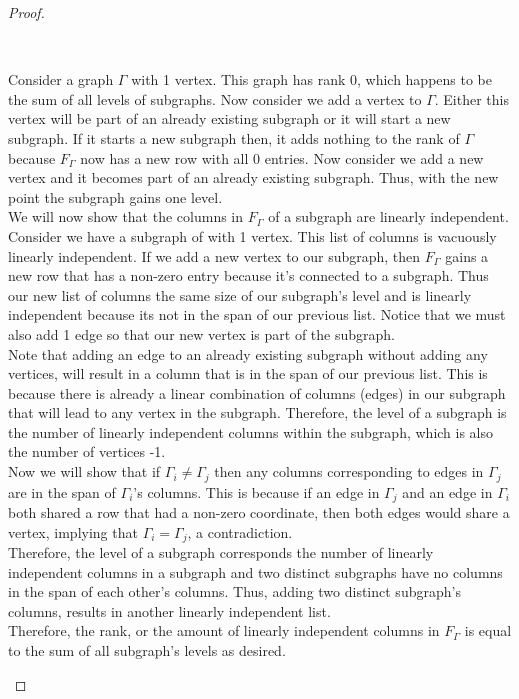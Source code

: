\documentclass[11pt]{article}
\newenvironment{myproof}
{\begin{proof} \begin{adjustwidth}{3em}{0pt}$ $\par\nobreak\ignorespaces}
{\end{adjustwidth} \end{proof}}
\begin{document}
\begin{flushleft}
\begin{myproof}
Consider a graph $\Gamma$ with 1 vertex. This graph has rank 0, which happens to be the sum of all levels of subgraphs. Now consider we add a vertex to $\Gamma$. Either this vertex will be part of an already existing subgraph or it will start a new subgraph. If it starts a new subgraph then, it adds nothing to the rank of $\Gamma$ because $F_\Gamma$ now has a new row with all 0 entries. Now consider we add a new vertex and it becomes part of an already existing subgraph. Thus, with the new point the subgraph gains one level. \\
\bigskip
We will now show that the columns in $F_\Gamma$ of a subgraph are linearly independent. Consider we have a subgraph of with 1 vertex. This list of columns is vacuously linearly independent. If we add a new vertex to our subgraph, then $F_\Gamma$ gains a new row that has a non-zero entry because it's connected to a subgraph. Thus our new list of columns the same size of our subgraph's level and is linearly independent because its not in the span of our previous list. Notice that we must also add 1 edge so that our new vertex is part of the subgraph. \\
\bigskip
Note that adding an edge to an already existing subgraph without adding any vertices, will result in a column that is in the span of our previous list. This is because there is already a linear combination of columns (edges) in our subgraph that will lead to any vertex in the subgraph. Therefore, the level of a subgraph is the number of linearly independent columns within the subgraph, which is also the number of vertices -1. \\
\bigskip
Now we will show that if $\Gamma_i \neq \Gamma_j$ then any columns corresponding to edges in $\Gamma_j$ are in the span of $\Gamma_i$'s columns. This is because if an edge in $\Gamma_j$ and an edge in $\Gamma_i$ both shared a row that had a non-zero coordinate, then both edges would share a vertex, implying that $\Gamma_i = \Gamma_j$, a contradiction. \\
\bigskip
Therefore, the level of a subgraph corresponds the number of linearly independent columns in a subgraph and two distinct subgraphs have no columns in the span of each other's columns. Thus, adding two distinct subgraph's columns, results in another linearly independent list. \\
\bigskip
Therefore, the rank, or the amount of linearly independent columns in $F_\Gamma$ is equal to the sum of all subgraph's levels as desired.

\end{myproof}


\end{flushleft}
\end{document}
